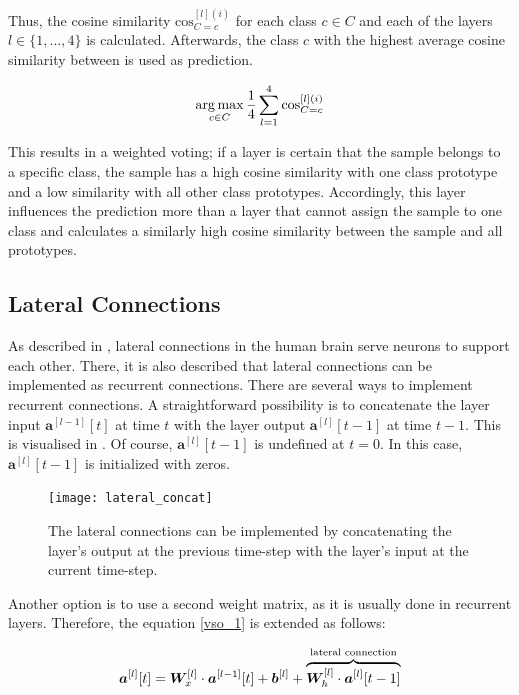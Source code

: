 Thus, the cosine similarity $\text{cos}^{[l](i)}_{C=c}$ for each class $c \in C$ and each of the layers $l \in \{1, ..., 4\}$ is calculated. Afterwards, the class $c$ with the highest average cosine similarity between  is used as prediction.

\begin{align}\eqlbl{vso_12}
		\argmax_{c \in C} \frac{1}{4} \sum_{l=1}^{4} \text{cos}^{[l](i)}_{C=c}
\end{align}

This results in a weighted voting; if a layer is certain that the sample belongs to a specific class, the sample has a high cosine similarity with one class prototype and a low similarity with all other class prototypes. Accordingly, this layer influences the prediction more than a layer that cannot assign the sample to one class and calculates a similarly high cosine similarity between the sample and all prototypes.

\subsection{Lateral Connections}
As described in , lateral connections in the human brain serve neurons to support each other.
There, it is also described that lateral connections can be implemented as recurrent connections.
There are several ways to implement recurrent connections. A straightforward possibility is to concatenate the layer input $\boldsymbol{a}^{[l-1]}[t]$ at time $t$ with the layer output $\boldsymbol{a}^{[l]}[t-1]$  at time $t-1$. This is visualised in . Of course, $\boldsymbol{a}^{[l]}[t-1]$ is undefined at $t=0$. In this case, $\boldsymbol{a}^{[l]}[t-1]$ is initialized with zeros.

\begin{figure}[h]
    \centering
    \texttt{[image: lateral\_concat]}
    \caption[Lateral connections by concatenating the layer's output with the layer's input]{The lateral connections can be implemented by concatenating the layer's output at the previous time-step with the layer's input at the current time-step.}
\end{figure}


Another option is to use a second weight matrix, as it is usually done in recurrent layers. Therefore, the equation \eqref{vso_1} is extended as follows:

\begin{align}\eqlbl{vso_13}
		\boldsymbol{a}^{[l]}[t] =  \boldsymbol{W}_x^{[l]} \cdot \boldsymbol{a}^{[l-1]}[t] + \boldsymbol{b}^{[l]} + \overbrace{\boldsymbol{W}_h^{[l]} \cdot \boldsymbol{a}^{[l]}[t-1] }^{\text{lateral connection}}
\end{align}

